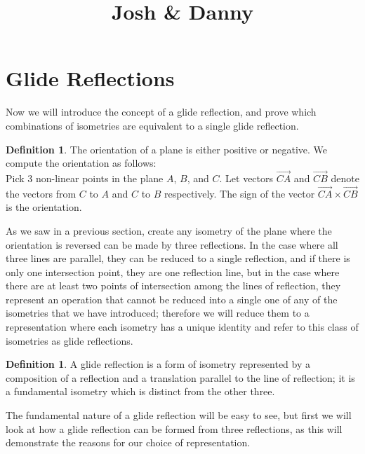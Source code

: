 \documentclass[11pt]{article}
\newcommand{\ray}[1]{\overrightarrow{#1}}
\theoremstyle{definition}
\newtheorem{definition}[]{Definition}
\begin{document}


\title{Josh \& Danny}

\maketitle

\section{Glide Reflections}
Now we will introduce the concept of a glide reflection, and prove which
combinations of isometries are equivalent to a single glide reflection.

\begin{definition}\label{orientation}
    The orientation of a plane is either positive or negative. We compute
    the orientation as follows: \\
    Pick 3 non-linear points in the plane $A$, $B$, and $C$. Let vectors
    $\ray{CA}$ and $\ray{CB}$ denote the vectors from $C$ to $A$ and $C$
    to $B$ respectively. The sign of the vector $\ray{CA} \times \ray{CB}$
    is the orientation.
\end{definition}

As we saw in a previous section, create any isometry of the plane where the
orientation is reversed can be made by three reflections. In the case where all
three lines are parallel, they can be reduced to a single reflection, and if
there is only one intersection point, they are one reflection line, but in the
case where there are at least two points of intersection among the lines of
reflection, they represent an operation that cannot be reduced into a single
one of any of the isometries that we have introduced; therefore we will reduce
them to a representation where each isometry has a unique identity and refer to
this class of isometries as glide reflections.

\begin{definition}\label{glide reflection}
  A glide reflection is a form of isometry represented by a composition of a
reflection and a translation parallel to the line of reflection; it is a
fundamental isometry which is distinct from the other three.
\end{definition}

The fundamental nature of a glide reflection will be easy to see, but first we
will look at how a glide reflection can be formed from three reflections, as
this will demonstrate the reasons for our choice of representation.
\end{document}
